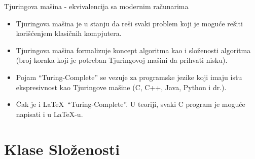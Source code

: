 \documentclass[aspectratio=169, xcolor=table, 10pt]{beamer}
\theoremstyle{definition}
\begin{document}
\begin{frame}{Tjuringova ma\v sina - ekvivalencija sa modernim ra\v cunarima}

\begin{itemize}
    \item Tjuringova ma\v sina je u stanju da re\v si svaki problem koji je mogu\' ce re\v siti kori\v s\' cenjem klasi\v cnih kompjutera.
    \item Tjuringova ma\v sina formalizuje koncept algoritma kao i slo\v zenosti algoritma (broj koraka koji je potreban Tjuringovoj ma\v sini da prihvati nisku).
    \item Pojam “Turing-Complete” se vezuje za programske jezike koji imaju istu ekspresivnost kao Tjuringove ma\v sine (C, C++, Java, Python i dr.).
    \item \v Cak je i \LaTeX \ “Turing-Complete”. U teoriji, svaki C program je mogu\' ce napisati i u \LaTeX-u.
\end{itemize}
    
\end{frame}

\section{Klase Slo\v zenosti}
\end{document}
